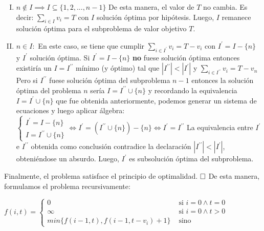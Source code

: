 \begin{enumerate}[I)]
\item $n \notin I \implies I \subseteq \{1, 2, ..., n-1\}$
	\vskip 0pt
	De esta manera, el valor de $T$ no cambia. Es decir: $\sum_{i \in I}v_{i}=T$ con $I$ solución óptima por hipótesis. Luego, $I$ remanece solución óptima para el subproblema de valor objetivo $T$.
\item $n \in I:$
	\vskip 0pt
	En este caso, se tiene que cumplir $\sum_{i \in I^\prime}v_{i}=T-v_{i}$ con $I^\prime=I-\{n\}$ y $I^\prime$ solución óptima.
	\vskip 8pt
	Si $I^\prime=I-\{n\}$ \textbf{no} fuese solución óptima entonces existiría un $I=I^{\prime\prime}$ mínimo (y óptimo) tal que $|I^{\prime\prime}| < |I^\prime|$ y $\sum_{i \in I^{\prime\prime}}v_{i} = T - v_{n}$
	\vskip 8pt
	Pero si $I^{\prime\prime}$ fuese solución óptima del subproblema $n-1$ entonces la solución óptima del problema $n$ sería $I = I^{\prime\prime} \cup \{n\}$ y recordando la equivalencia $I=I^\prime \cup \{n\}$ que fue obtenida anteriormente, podemos generar un sistema de ecuaciones y luego aplicar álgebra:
	\vskip 8pt
	$
		\begin{cases}
			I^\prime = I - \{n\} \\ 
			I = I^{\prime\prime} \cup \{n\}
		\end{cases}
		\iff
		I^\prime = (I^{\prime\prime} \cup \{n\}) - \{n\} \iff I^\prime = I^{\prime\prime}
	$
	\vskip 8pt
	La equivalencia entre $I^\prime$ e $I^{\prime\prime}$ obtenida como conclusión contradice la declaración $|I^{\prime\prime}| < |I^\prime|$, obteniéndose un absurdo. Luego, $I^\prime$ es subsolución óptima del subproblema.
\end{enumerate}
Finalmente, el problema satisface el principio de optimalidad.
$\qedwhite$
\vskip 8pt
De esta manera, formulamos el problema recursivamente:
\vskip 8pt
\begin{center}
	$
	f(i, t) =
	\begin{cases}
		0 & \mbox{ si } i = 0 \wedge t = 0 \\
		\infty & \mbox{ si } i = 0 \wedge t > 0 \\
		min\{f(i - 1, t), f(i - 1, t - v_{i}) + 1\}  & \mbox{ sino}
	\end{cases}
$
\end{center}

